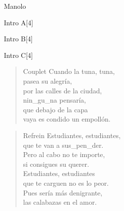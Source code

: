 \begin{song}{Manolo}
\begin{instrumental}{Intro A}[4]
\measure{}\measure{}
\measure{}
\end{instrumental}

\begin{instrumental}{Intro B}[4]
\measure{}\measure{}
\measure{}
\end{instrumental}

\begin{instrumental}{Intro C}[4]
\measure{}
\measure{}
\measure{}
\measure{}
\end{instrumental}

\begin{verse}{Couplet}
Cuando la tuna, tuna,\\
pasea su alegría,\\
por las calles de la ciudad,\\
nin\_gu\_na pensaría,\\
que debajo de la capa\\
vaya es condido un empollón.
\end{verse}
\begin{verse}{Refrein}
Estudiantes, estudiantes,\\
que te van a sus\_pen\_der.\\
\chord{}Pero al cabo no te importe,\\
si consigues su querer.\\
\vspace{1em}
Estudiantes, estudiantes\\
que te carguen no es lo peor.\\
Pues sería \hspace{0.5em}\hspace{2em} más denigrante,\hspace{1em}\\
las calabazas\hspace{0.5em}\hspace{2em} en el amor.\hspace{1em}\hspace{2em}
\end{verse}
\end{song}
